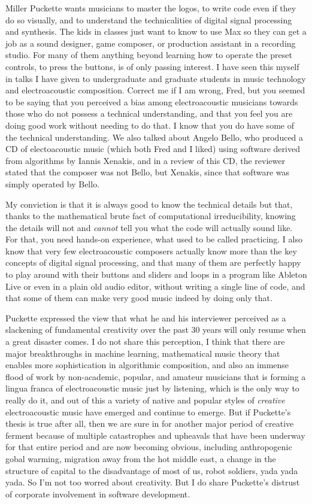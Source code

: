 \documentclass[a4paper,10pt]{article}
\begin{document}
Miller Puckette wants musicians to master the logos, to write code even if they do so visually, and to understand the technicalities of digital signal processing and synthesis. The kids in classes just want to know to use Max so they can get a job as a sound designer, game composer, or production assistant in a recording studio. For many of them anything beyond learning how to operate the preset controls, to press the buttons, is of only passing interest. I have seen this myself in talks I have given to undergraduate and graduate students in music technology and electroacoustic composition. Correct me if I am wrong, Fred, but you seemed to be saying that you perceived a bias among electroacoustic musicians towards those who do not possess a technical understanding, and that you feel you are doing good work without needing to do that. I know that you do have some of the technical understanding. We also talked about Angelo Bello, who produced a CD of electoacoustic music (which both Fred and I liked) using software derived from algorithms by Iannis Xenakis, and in a review of this CD, the reviewer stated that the composer was not Bello, but Xenakis, since that software was simply operated by Bello.

My conviction is that it is always good to know the technical details but that, thanks to the mathematical brute fact of computational irreducibility, knowing the details will not and \textit{cannot} tell you what the code will actually sound like. For that, you need hands-on experience, what used to be called practicing. I also know that very few electroacoustic composers actually know more than the key concepts of digital signal processing, and that many of them are perfectly happy to play around with their buttons and sliders and loops in a program like Ableton Live or even in a plain old audio editor, without writing a single line of code, and that some of them can make very good music indeed by doing only that. 

Puckette expressed the view that what he and his interviewer perceived as a slackening of fundamental creativity over the past 30 years will only resume when a great disaster comes. I do not share this perception, I think that there are major breakthroughs in machine learning, mathematical music theory that enables more sophistication in algorithmic composition, and also an immense flood of work by non-academic, popular, and amateur musicians that is forming a lingua franca of electroacoustic music just by listening, which is the only way to really do it, and out of this a variety of native and popular styles of \textit{creative} electroacoustic music have emerged and continue to emerge. But if Puckette's thesis is true after all, then we are sure in for another major period of creative ferment because of multiple catastrophes and upheavals that have been underway for that entire period and are now becoming obvious, including anthropogenic gobal warming, migration away from the hot middle east, a change in the structure of capital to the disadvantage of most of us, robot soldiers, yada yada yada. So I'm not too worred about creativity. But I do share Puckette's distrust of corporate involvement in software development.
\end{document}
